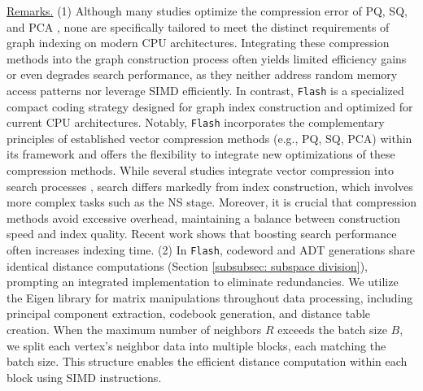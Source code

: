 \vspace{0.2cm}
\noindent\underline{Remarks.}
(1) {Although many studies optimize the compression error of PQ, SQ, and PCA \cite{OPQ,ScaNN,LVQ,ZhangTHW22}, none are specifically tailored to meet the distinct requirements of graph indexing on modern CPU architectures. Integrating these compression methods into the graph construction process often yields limited efficiency gains or even degrades search performance, as they neither address random memory access patterns nor leverage SIMD efficiently. In contrast, \texttt{Flash} is a specialized compact coding strategy designed for graph index construction and optimized for current CPU architectures. Notably, \texttt{Flash} incorporates the complementary principles of established vector compression methods (e.g., PQ, SQ, PCA) within its framework and offers the flexibility to integrate new optimizations of these compression methods. While several studies integrate vector compression into search processes \cite{yue2023routing,DiskANN,Starling,LVQ}, search differs markedly from index construction, which involves more complex tasks such as the NS stage. Moreover, it is crucial that compression methods avoid excessive overhead, maintaining a balance between construction speed and index quality. Recent work \cite{yue2023routing,DiskANN,Starling,yang2024bridging} shows that boosting search performance often increases indexing time.}
(2) In \texttt{Flash}, codeword and ADT generations share identical distance computations (Section \ref{subsubsec: subspace division}), prompting an integrated implementation to eliminate redundancies. We utilize the Eigen library for matrix manipulations throughout data processing, including principal component extraction, codebook generation, and distance table creation. When the maximum number of neighbors $R$ exceeds the batch size $B$, we split each vertex's neighbor data into multiple blocks, each matching the batch size. This structure enables the efficient distance computation within each block using SIMD instructions.

